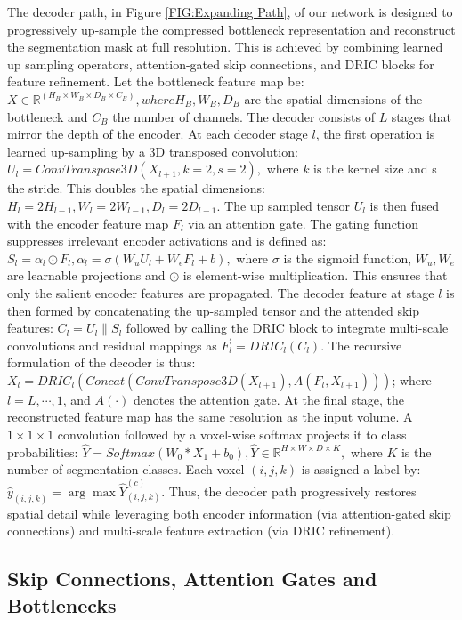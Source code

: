 \documentclass[a4paper,fleqn]{cas-dc}
\begin{document}
The decoder path, in Figure \ref{FIG:Expanding Path}, of our network is designed to progressively up-sample the compressed bottleneck representation and reconstruct the segmentation mask at full resolution. This is achieved by combining learned up sampling operators, attention-gated skip connections, and DRIC blocks for feature refinement.
Let the bottleneck feature map be: $X\in \mathbb{R}^{(H_B\times W_B\times D_B\times C_B)}, where H_B, W_B, D_B$ are the spatial dimensions of the bottleneck and $C_B$ the number of channels. The decoder consists of $L$ stages that mirror the depth of the encoder.
At each decoder stage $l$, the first operation is learned up-sampling by a 3D transposed convolution: $U_l=ConvTranspose3D(X_{l+1},k=2,s=2),$ where $k$ is the kernel size and s the stride. This doubles the spatial dimensions: $H_l=2H_{l-1}, W_l=2W_{l-1}, D_l=2D_{l-1}$.
The up sampled tensor $U_l$ is then fused with the encoder feature map $F_l$ via an attention gate. The gating function suppresses irrelevant encoder activations and is defined as: $S_l=\alpha_l\odot F_l, \alpha_l=\sigma(W_u U_l+W_e F_l+b),$ where $\sigma$ is the sigmoid function, $W_u, W_e$ are learnable projections and $\odot $ is element-wise multiplication. This ensures that only the salient encoder features are propagated.
The decoder feature at stage $l$ is then formed by concatenating the up-sampled tensor and the attended skip features: $C_l= U_l \| S_l$ followed by calling the DRIC block to integrate multi-scale convolutions and residual mappings as $F_l^{'}= DRIC_l (C_l)$.
The recursive formulation of the decoder is thus: {\small$X_l= DRIC_l (Concat(ConvTranspose3D(X_{l+1}),A(F_l,X_{l+1})))$}; where $l = L,\cdots,1$, and $A(\cdot)$ denotes the attention gate.
At the final stage, the reconstructed feature map has the same resolution as the input volume. A $1\times 1\times 1$ convolution followed by a voxel-wise softmax projects it to class probabilities: $\hat{Y} = Softmax(W_0 * X_1 + b_0), \hat{Y} \in \mathbb{R}^{H\times W\times D\times K},$ where $K$ is the number of segmentation classes. Each voxel $(i,j,k)$ is assigned a label by: $\hat{y}_{(i,j,k)} = \arg\max \hat{Y}^{(c)}_{(i,j,k)}$.
Thus, the decoder path progressively restores spatial detail while leveraging both encoder information (via attention-gated skip connections) and multi-scale feature extraction (via DRIC refinement).


\subsection{Skip Connections, Attention Gates and Bottlenecks}
\end{document}
